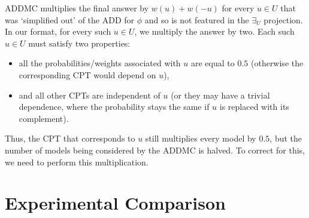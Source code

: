 \documentclass{article}
\theoremstyle{definition}
\theoremstyle{remark}
\begin{document}
ADDMC multiplies the final answer by $w(u)+w(-u)$ for every $u \in U$ that was
`simplified out' of the ADD for $\phi$ and so is not featured in the $\exists_U$
projection. In our format, for every such $u \in U$, we multiply the answer by
two. Each such $u \in U$ must satisfy two properties:
\begin{itemize}
\item all the probabilities/weights associated with $u$ are equal to $0.5$
  (otherwise the corresponding CPT would depend on $u$),
\item and all other CPTs are independent of $u$ (or they may have a trivial
  dependence, where the probability stays the same if $u$ is replaced with its
  complement).
\end{itemize}
Thus, the CPT that corresponds to $u$ still multiplies every model by $0.5$, but
the number of models being considered by the ADDMC is halved. To correct for
this, we need to perform this multiplication.

\section{Experimental Comparison} \label{sec:experiments}
\end{document}
